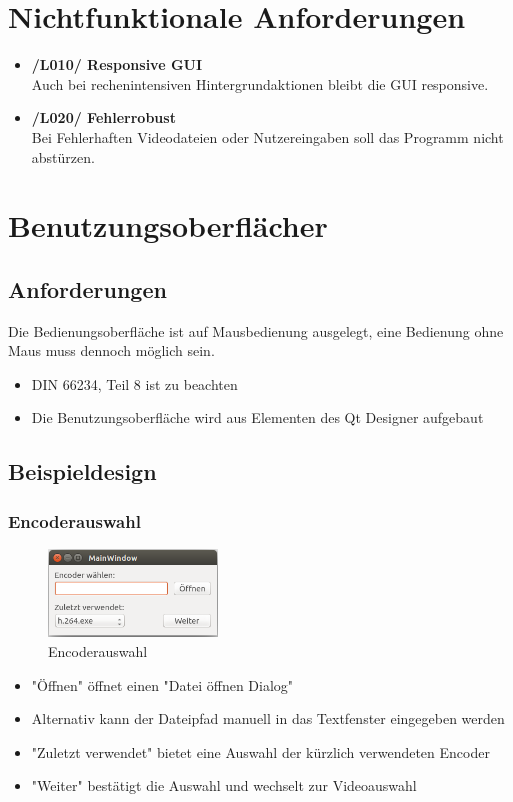 \documentclass[parskip=full]{scrartcl}
\begin{document}
\section{Nichtfunktionale Anforderungen}
\begin{itemize}
\item[]\textbf{/L010/ Responsive GUI}\\
Auch bei rechenintensiven Hintergrundaktionen bleibt die GUI responsive.
\item[]\textbf{/L020/ Fehlerrobust}\\
Bei Fehlerhaften Videodateien oder Nutzereingaben soll das Programm nicht abstürzen.
\end{itemize}
\newpage
\section{Benutzungsoberflächer}
\subsection{Anforderungen}
Die Bedienungsoberfläche ist auf Mausbedienung ausgelegt, eine Bedienung ohne Maus muss dennoch möglich sein.
\begin{itemize}
\item DIN 66234, Teil 8 ist zu beachten
\item Die Benutzungsoberfläche wird aus Elementen des Qt Designer aufgebaut
\end{itemize}
\subsection{Beispieldesign}
\subsubsection{Encoderauswahl}
\begin{figure}[htbp] 
\centering
\includegraphics[width=0.4\textwidth]{GUI_Entwurf_1/GUI_1.png}
\caption{Encoderauswahl}
\end{figure}
\begin{itemize}
\item "Öffnen" öffnet einen "Datei öffnen Dialog"
\item Alternativ kann der Dateipfad manuell in das Textfenster eingegeben werden
\item "Zuletzt verwendet" bietet eine Auswahl der kürzlich verwendeten Encoder
\item "Weiter" bestätigt die Auswahl und wechselt zur Videoauswahl
\end{itemize}
\end{document}

